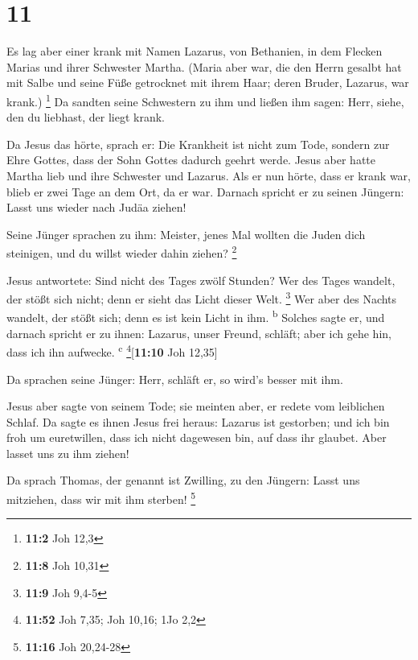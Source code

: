 \hypertarget{section-10}{%
\section{11}\label{section-10}}

 Es lag aber einer krank mit Namen Lazarus, von Bethanien,
in dem Flecken Marias und ihrer Schwester Martha.  (Maria
aber war, die den Herrn gesalbt hat mit Salbe und seine Füße getrocknet
mit ihrem Haar; deren Bruder, Lazarus, war krank.) \footnote{\textbf{11:2}
  Joh 12,3}  Da sandten seine Schwestern zu ihm und ließen
ihm sagen: Herr, siehe, den du liebhast, der liegt krank.

 Da Jesus das hörte, sprach er: Die Krankheit ist nicht
zum Tode, sondern zur Ehre Gottes, dass der Sohn Gottes dadurch geehrt
werde.  Jesus aber hatte Martha lieb und ihre Schwester
und Lazarus.  Als er nun hörte, dass er krank war, blieb
er zwei Tage an dem Ort, da er war.  Darnach spricht er zu
seinen Jüngern: Lasst uns wieder nach Judäa ziehen!

 Seine Jünger sprachen zu ihm: Meister, jenes Mal wollten
die Juden dich steinigen, und du willst wieder dahin ziehen? \footnote{\textbf{11:8}
  Joh 10,31}

 Jesus antwortete: Sind nicht des Tages zwölf Stunden? Wer
des Tages wandelt, der stößt sich nicht; denn er sieht das Licht dieser
Welt. \footnote{\textbf{11:9} Joh 9,4-5}  Wer aber des
Nachts wandelt, der stößt sich; denn es ist kein Licht in ihm.
\textsuperscript{b}  Solches sagte er, und darnach
spricht er zu ihnen: Lazarus, unser Freund, schläft; aber ich gehe hin,
dass ich ihn aufwecke. \textsuperscript{c} \footnote{\textbf{11:52} Joh
  7,35; Joh 10,16; 1Jo 2,2}{[}\textbf{11:10} Joh 12,35{]}

 Da sprachen seine Jünger: Herr, schläft er, so wird's
besser mit ihm.

 Jesus aber sagte von seinem Tode; sie meinten aber, er
redete vom leiblichen Schlaf.  Da sagte es ihnen Jesus
frei heraus: Lazarus ist gestorben;  und ich bin froh um
euretwillen, dass ich nicht dagewesen bin, auf dass ihr glaubet. Aber
lasset uns zu ihm ziehen!

 Da sprach Thomas, der genannt ist Zwilling, zu den
Jüngern: Lasst uns mitziehen, dass wir mit ihm sterben! \footnote{\textbf{11:16}
  Joh 20,24-28}

